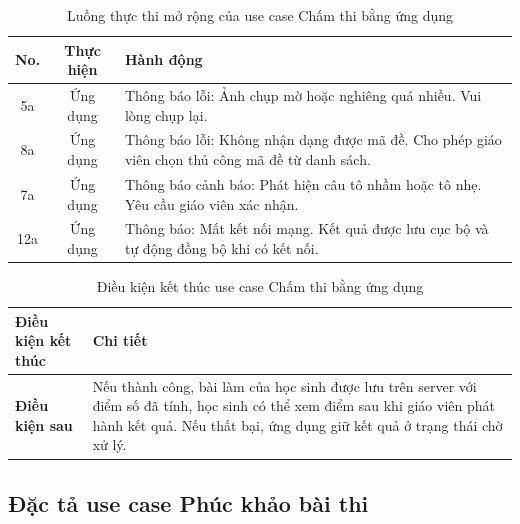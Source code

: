 ﻿\documentclass[../DoAn.tex]{subfiles}
\begin{document}
\begin{table}[H]
\centering
\begin{tabular}{|c|c|p{9cm}|}
\hline
\textbf{No.} & \textbf{Thực hiện} & \textbf{Hành động} \\ \hline
5a & Ứng dụng & Thông báo lỗi: Ảnh chụp mờ hoặc nghiêng quá nhiều. Vui lòng chụp lại. \\ \hline
8a & Ứng dụng & Thông báo lỗi: Không nhận dạng được mã đề. Cho phép giáo viên chọn thủ công mã đề từ danh sách. \\ \hline
7a & Ứng dụng & Thông báo cảnh báo: Phát hiện câu tô nhầm hoặc tô nhẹ. Yêu cầu giáo viên xác nhận. \\ \hline
12a & Ứng dụng & Thông báo: Mất kết nối mạng. Kết quả được lưu cục bộ và tự động đồng bộ khi có kết nối. \\ \hline
\end{tabular}
\caption{Luồng thực thi mở rộng của use case Chấm thi bằng ứng dụng}
\label{table:2.3.4_ext}
\end{table}
\begin{table}[H]
\centering
\begin{tabular}{|p{4cm}|p{10cm}|}
\hline
\textbf{Điều kiện kết thúc} & \textbf{Chi tiết} \\ \hline
\textbf{Điều kiện sau} & Nếu thành công, bài làm của học sinh được lưu trên server với điểm số đã tính, học sinh có thể xem điểm sau khi giáo viên phát hành kết quả. Nếu thất bại, ứng dụng giữ kết quả ở trạng thái chờ xử lý. \\ \hline
\end{tabular}
\caption{Điều kiện kết thúc use case Chấm thi bằng ứng dụng}
\label{table:2.3.4_post}
\end{table}
\subsection{Đặc tả use case Phúc khảo bài thi}
\label{subsection:2.3.5}
\end{document}
